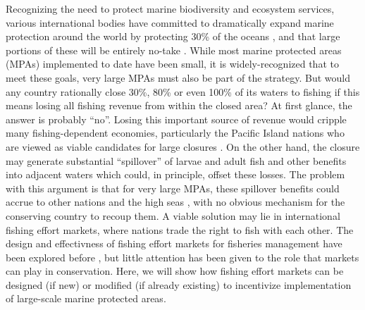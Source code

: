 \documentclass[12pt]{article}
\begin{document}
Recognizing the need to protect marine biodiversity and ecosystem services, various international bodies have committed to dramatically expand marine protection around the world by protecting 30\% of the oceans \cite{oleary_2016,dinerstein_2019}, and that large portions of these will be entirely no-take \cite{sala_2017,sala_2018}. While most marine protected areas (MPAs) implemented to date have been small, it is widely-recognized that to meet these goals, very large MPAs must also be part of the strategy. But would any country rationally close 30\%, 80\% or even 100\% of its waters to fishing if this means losing all fishing revenue from within the closed area? At first glance, the answer is probably ``no''. Losing this important source of revenue would cripple many fishing-dependent economies, particularly the Pacific Island nations who are viewed as viable candidates for large closures \cite{mcleod_2019}. On the other hand, the closure may generate substantial ``spillover'' of larvae and adult fish \cite{ramesh_2019,hernndez_2019} and other benefits into adjacent waters which could, in principle, offset these losses. The problem with this argument is that for very large MPAs, these spillover benefits could accrue to other nations and the high seas \cite{agardy_2018}, with no obvious mechanism for the conserving country to recoup them. A viable solution may lie in international fishing effort markets, where nations trade the right to fish with each other. The design and effectivness of fishing effort markets for fisheries management have been explored before \cite{havice_2010,havice_2013}, but little attention has been given to the role that markets can play in conservation. Here, we will show how fishing effort markets can be designed (if new) or modified (if already existing) to incentivize implementation of large-scale marine protected areas.
\end{document}
